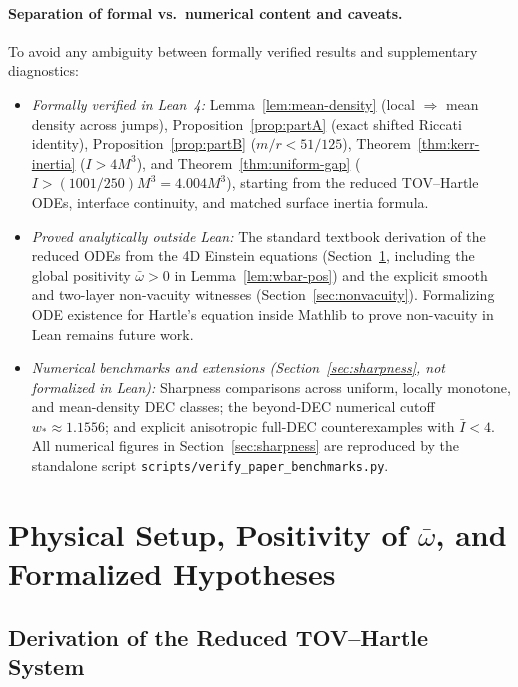 \documentclass[11pt]{article}
\theoremstyle{plain}
\theoremstyle{definition}
\newcommand{\Ibar}{\bar{I}}
\newcommand{\wbar}{\bar{\omega}}
\begin{document}
\paragraph{Separation of formal vs.\ numerical content and caveats.}
To avoid any ambiguity between formally verified results and supplementary diagnostics:
\begin{itemize}
  \item \emph{Formally verified in Lean~4:} Lemma~\ref{lem:mean-density} (local $\Rightarrow$ mean density across jumps), Proposition~\ref{prop:partA} (exact shifted Riccati identity), Proposition~\ref{prop:partB} ($m/r < 51/125$), Theorem~\ref{thm:kerr-inertia} ($I > 4 M^3$), and Theorem~\ref{thm:uniform-gap} ($I > (1001/250) M^3 = 4.004 M^3$), starting from the reduced TOV--Hartle ODEs, interface continuity, and matched surface inertia formula.
  \item \emph{Proved analytically outside Lean:} The standard textbook derivation of the reduced ODEs from the 4D Einstein equations (Section~\ref{sec:setup}, including the global positivity $\wbar > 0$ in Lemma~\ref{lem:wbar-pos}) and the explicit smooth and two-layer non-vacuity witnesses (Section~\ref{sec:nonvacuity}). Formalizing ODE existence for Hartle's equation inside Mathlib to prove non-vacuity in Lean remains future work.
  \item \emph{Numerical benchmarks and extensions (Section~\ref{sec:sharpness}, not formalized in Lean):} Sharpness comparisons across uniform, locally monotone, and mean-density DEC classes; the beyond-DEC numerical cutoff $w_* \approx 1.1556$; and explicit anisotropic full-DEC counterexamples with $\Ibar < 4$. All numerical figures in Section~\ref{sec:sharpness} are reproduced by the standalone script \texttt{scripts/verify\_paper\_benchmarks.py}.
\end{itemize}

\section{Physical Setup, Positivity of \texorpdfstring{$\wbar$}{wbar}, and Formalized Hypotheses}
\label{sec:setup}

\subsection{Derivation of the Reduced TOV--Hartle System}
\end{document}
